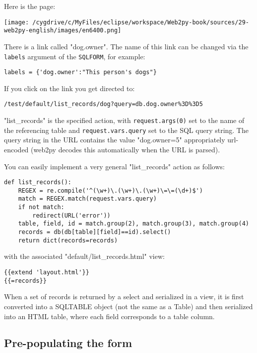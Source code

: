 \documentclass[justified,sixbynine,notoc]{tufte-book}
\def\ft{\small\tt}
\begin{document}
\begin{fullwidth}
Here is the page:


\goodbreak\begin{center}\texttt{[image: /cygdrive/c/MyFiles/eclipse/workspace/Web2py-book/sources/29-web2py-english/images/en6400.png]}\end{center}


There is a link called "dog.owner". The name of this link can be changed via the {\ft labels} argument of the {\ft SQLFORM}, for example:
\begin{lstlisting}
labels = {'dog.owner':"This person's dogs"}
\end{lstlisting}

If you click on the link you get directed to:
\begin{lstlisting}
/test/default/list_records/dog?query=db.dog.owner%3D%3D5
\end{lstlisting}

"list\_records" is the specified action, with {\ft request.args(0)} set to the name of the referencing table and {\ft request.vars.query} set to the SQL query string.
The query string in the URL
contains the value "dog.owner=5" appropriately url-encoded
(web2py decodes this automatically when the URL is parsed).

You can easily implement a very general "list\_records" action as follows:
\begin{lstlisting}
def list_records():
    REGEX = re.compile('^(\w+)\.(\w+)\.(\w+)\=\=(\d+)$')
    match = REGEX.match(request.vars.query)
    if not match:
        redirect(URL('error'))
    table, field, id = match.group(2), match.group(3), match.group(4)
    records = db(db[table][field]==id).select()
    return dict(records=records)
\end{lstlisting}
\noindent with the associated "default/list\_records.html" view:
\begin{lstlisting}[keywords={}]
{{extend 'layout.html'}}
{{=records}}
\end{lstlisting}

When a set of records is returned by a select and serialized in a view, it is first converted into a SQLTABLE object (not the same as a Table) and then serialized into an HTML table, where each field corresponds to a table column.

\goodbreak\subsection{Pre-populating the form}


\end{fullwidth}
\end{document}
